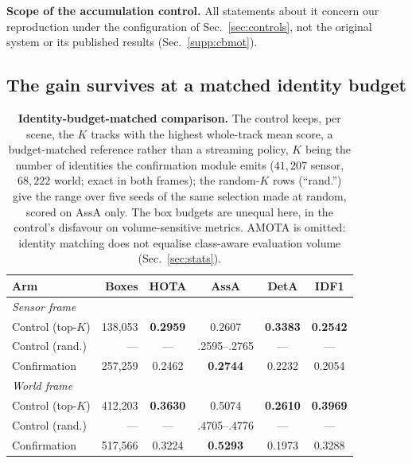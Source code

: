 \noindent\textbf{Scope of the accumulation control.} All statements about it
concern our reproduction under the configuration of Sec.~\ref{sec:controls},
not the original system or its published results
(Sec.~\ref{supp:cbmot}).

\subsection{The gain survives at a matched identity budget}
\label{sec:idmatch}

\begin{table}[tb]
\centering\footnotesize
\setlength{\tabcolsep}{1.5pt}
\begin{tabular}{lrcccc}
\toprule
Arm & Boxes & HOTA & AssA & DetA & IDF1 \\
\midrule
\multicolumn{6}{l}{\emph{Sensor frame}} \\
Control (top-$K$)  & 138{,}053 & \textbf{0.2959} & 0.2607 & \textbf{0.3383} & \textbf{0.2542} \\
Control (rand.) & --- & --- &.2595--.2765 & --- & --- \\
Confirmation       & 257{,}259 & 0.2462 & \textbf{0.2744} & 0.2232 & 0.2054 \\
\midrule
\multicolumn{6}{l}{\emph{World frame}} \\
Control (top-$K$)  & 412{,}203 & \textbf{0.3630} & 0.5074 & \textbf{0.2610} & \textbf{0.3969} \\
Control (rand.) & --- & --- &.4705--.4776 & --- & --- \\
Confirmation       & 517{,}566 & 0.3224 & \textbf{0.5293} & 0.1973 & 0.3288 \\
\bottomrule
\end{tabular}
\caption{\textbf{Identity-budget-matched comparison.} The control keeps, per
scene, the $K$ tracks with the highest whole-track mean score, a budget-matched
reference rather than a streaming policy, $K$ being the number of identities the
confirmation module emits ($41{,}207$ sensor, $68{,}222$ world; exact in both
frames); the random-$K$ rows (``rand.'') give the range over five seeds of the
same selection made at random, scored on AssA only. The box budgets are
unequal here, in the control's disfavour on volume-sensitive metrics. AMOTA is
omitted: identity matching does not equalise class-aware evaluation volume
(Sec.~\ref{sec:stats}).}
\label{tab:idmatch}
\end{table}

